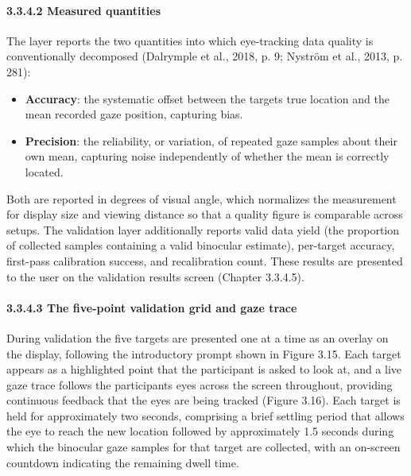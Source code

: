 \documentclass[
]{article}
\begin{document}
\hypertarget{measured-quantities}{%
\paragraph{3.3.4.2 Measured quantities}\label{measured-quantities}}

The layer reports the two quantities into which eye-tracking data quality is conventionally decomposed (Dalrymple et al., 2018, p. 9; Nyström et al., 2013, p. 281):

\begin{itemize}
\item
  \textbf{Accuracy}: the systematic offset between the target\textquotesingle s true location and the mean recorded gaze position, capturing bias.
\item
  \textbf{Precision}: the reliability, or variation, of repeated gaze samples about their own mean, capturing noise independently of whether the mean is correctly located.
\end{itemize}

Both are reported in degrees of visual angle, which normalizes the measurement for display size and viewing distance so that a quality figure is comparable across setups. The validation layer additionally reports valid data yield (the proportion of collected samples containing a valid binocular estimate), per-target accuracy, first-pass calibration success, and recalibration count. These results are presented to the user on the validation results screen (Chapter 3.3.4.5).

\hypertarget{the-five-point-validation-grid-and-gaze-trace}{%
\paragraph{3.3.4.3 The five-point validation grid and gaze trace}\label{the-five-point-validation-grid-and-gaze-trace}}

During validation the five targets are presented one at a time as an overlay on the display, following the introductory prompt shown in Figure 3.15. Each target appears as a highlighted point that the participant is asked to look at, and a live gaze trace follows the participant\textquotesingle s eyes across the screen throughout, providing continuous feedback that the eyes are being tracked (Figure 3.16). Each target is held for approximately two seconds, comprising a brief settling period that allows the eye to reach the new location followed by approximately 1.5 seconds during which the binocular gaze samples for that target are collected, with an on-screen countdown indicating the remaining dwell time.
\end{document}
